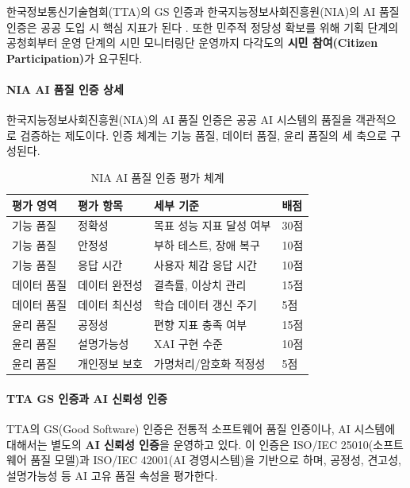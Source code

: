 한국정보통신기술협회(TTA\cite{tta2024trust})의 GS 인증과 한국지능정보사회진흥원(NIA)의 AI 품질 인증은 공공 도입 시 핵심 지표가 된다 \cite{nia2024quality, tta2024trust}. 또한 민주적 정당성 확보를 위해 기획 단계의 공청회부터 운영 단계의 시민 모니터링단 운영까지 다각도의 \textbf{시민 참여(Citizen Participation)}가 요구된다.

\paragraph{NIA AI 품질 인증 상세}

한국지능정보사회진흥원(NIA)의 AI 품질 인증은 공공 AI 시스템의 품질을 객관적으로 검증하는 제도이다. 인증 체계는 기능 품질, 데이터 품질, 윤리 품질의 세 축으로 구성된다.

\begin{table}[htbp]
\centering
\caption{NIA AI 품질 인증 평가 체계}
\label{tab:18_nia}
\begin{tabularx}{\textwidth}{p{2.5cm}p{3cm}Xp{2cm}}
\toprule
\textbf{평가 영역} & \textbf{평가 항목} & \textbf{세부 기준} & \textbf{배점} \\
\midrule
기능 품질 & 정확성 & 목표 성능 지표 달성 여부 & 30점 \\
기능 품질 & 안정성 & 부하 테스트, 장애 복구 & 10점 \\
기능 품질 & 응답 시간 & 사용자 체감 응답 시간 & 10점 \\
데이터 품질 & 데이터 완전성 & 결측률, 이상치 관리 & 15점 \\
데이터 품질 & 데이터 최신성 & 학습 데이터 갱신 주기 & 5점 \\
윤리 품질 & 공정성 & 편향 지표 충족 여부 & 15점 \\
윤리 품질 & 설명가능성 & XAI 구현 수준 & 10점 \\
윤리 품질 & 개인정보 보호 & 가명처리/암호화 적정성 & 5점 \\
\bottomrule
\end{tabularx}
\end{table}

\paragraph{TTA GS 인증과 AI 신뢰성 인증}

TTA의 GS(Good Software) 인증은 전통적 소프트웨어 품질 인증이나, AI 시스템에 대해서는 별도의 \textbf{AI 신뢰성 인증}을 운영하고 있다. 이 인증은 ISO/IEC 25010(소프트웨어 품질 모델)과 ISO/IEC 42001(AI 경영시스템)을 기반으로 하며, 공정성, 견고성, 설명가능성 등 AI 고유 품질 속성을 평가한다.

